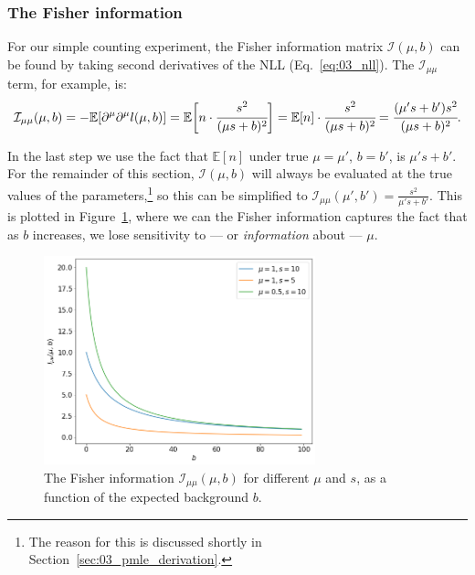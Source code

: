 \subsubsection{The Fisher information}

For our simple counting experiment, the Fisher information matrix $\mathcal I(\mu, b)$ can be found by taking second derivatives of the NLL (Eq.~\ref{eq:03_nll}). 
The $\mathcal I_{\mu\mu}$ term, for example, is:
\begin{equation}
    \mathcal I_{\mu\mu}(\mu, b) = - \mathbb E[\partial^\mu\partial^\mu l(\mu, b)] = \mathbb E \bigg[n \cdot \cfrac{s^2}{(\mu s + b)^2}\bigg] = \mathbb E[n] \cdot \cfrac{s^2}{(\mu s + b)^2} = \cfrac{(\mu' s + b') s^2}{(\mu s + b)^2}.
\label{eq:03_fisher}
\end{equation}

In the last step we use the fact that $\mathbb E[n]$ under true $\mu = \mu'$, $b = b'$, is $\mu' s + b'$.
For the remainder of this section, $\mathcal I(\mu, b)$ will always be evaluated at the true values of the parameters,\footnote{The reason for this is discussed shortly in Section~\ref{sec:03_pmle_derivation}.} so this can be simplified to $\mathcal I_{\mu\mu}(\mu', b') = \frac{s^2}{\mu' s + b'}$.
This is plotted in Figure~\ref{fig:03_fisher}, where we can the Fisher information captures the fact that as $b$ increases, we lose sensitivity to --- or \textit{information} about --- $\mu$.

\begin{figure}[htb]
\centering
\includegraphics[width=0.7\textwidth]{figures/03-Stats/05-asymptotic-mle/3.png}
\caption{The Fisher information $\mathcal I_{\mu\mu}(\mu, b)$ for different $\mu$ and $s$, as a function of the expected background $b$.}
\label{fig:03_fisher}
\end{figure}

